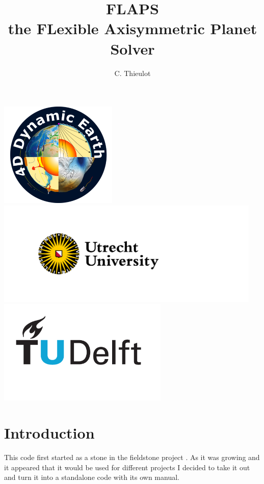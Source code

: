 \documentclass[a4paper,12pt]{article}
\begin{document}
\title{FLAPS \\ the FLexible Axisymmetric Planet Solver}
\author{C. Thieulot}
\maketitle

\begin{center}
\includegraphics[height=5cm]{images/4DDynamicEarth}
\includegraphics[height=5cm]{images/UU}
\includegraphics[height=5cm]{images/tudelft}
\end{center}

\newpage

\tableofcontents

\newpage
\section{Introduction}

This code first started as a stone in the fieldstone project \cite{fieldstone}.
As it was growing and it appeared that it would be used for different projects
I decided to take it out and turn it into a standalone code with its own manual.
\end{document}
